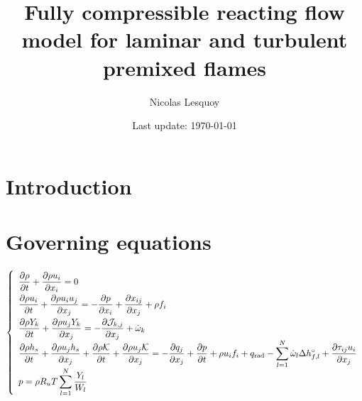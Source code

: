 \documentclass[10pt,a4paper]{article}
\title{Fully compressible reacting flow model for laminar and turbulent premixed flames}
\author{Nicolas Lesquoy}
\date{Last update: \today}
\begin{document}
\maketitle
\tableofcontents
\section{Introduction}
\label{sec:introduction}
\section{Governing equations}
\label{sec:governing_equations}
\begin{equation}
    \label{eq:governing_equations}
    {
        \renewcommand{\arraystretch}{2}\left\lbrace\begin{array}{l}
            \dfrac{\partial \rho}{\partial t} + \dfrac{\partial \rho u_i}{\partial x_i} = 0 \\
            \dfrac{\partial \rho u_i}{\partial t} + \dfrac{\partial \rho u_i u_j}{\partial x_j} = -\dfrac{\partial p}{\partial x_i} + \dfrac{\partial x_{ij}}{\partial x_j} + \rho f_i \\
            \dfrac{\partial \rho Y_k}{\partial t} + \dfrac{\partial \rho u_j Y_k}{\partial x_j} = -\dfrac{\partial \mathcal{J}_{k,j}}{\partial x_j} + \dot{\omega}_k \\
            \dfrac{\partial \rho h_s}{\partial t} + \dfrac{\partial \rho u_j h_s}{\partial x_j} + \dfrac{\partial \rho \mathcal{K}}{\partial t} + \dfrac{\partial \rho u_j \mathcal{K}}{\partial x_j} = -\dfrac{\partial q_j}{\partial x_j} + \dfrac{\partial p}{\partial t} + \rho u_i f_i + q_\mathrm{rad} - \displaystyle\sum_{l=1}^{N}\dot{\omega}_l \Delta h_{f,l}^\circ + \dfrac{\partial \tau_{ij} u_i}{\partial x_j} \\
            p = \rho R_u T \displaystyle\sum_{l=1}^{N} \dfrac{Y_l}{W_l} \\
        \end{array}\right.
    }
\end{equation}
\end{document}
